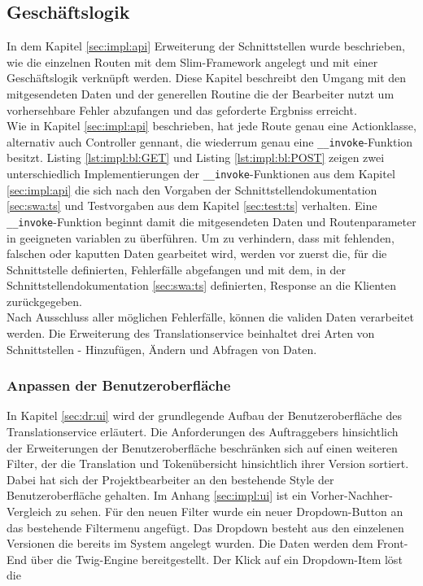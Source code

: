 \documentclass[10pt, oneside]{article}
\begin{document}
  \subsection{Geschäftslogik}\label{sec:impl:bl}
    In dem Kapitel \ref{sec:impl:api} Erweiterung der Schnittstellen wurde beschrieben, wie die einzelnen Routen mit dem Slim-Framework angelegt und 
    mit einer Geschäftslogik verknüpft werden. Diese Kapitel beschreibt den Umgang mit den mitgesendeten Daten und der generellen Routine die der Bearbeiter
    nutzt um vorhersehbare Fehler abzufangen und das geforderte Ergbniss erreicht.\\ 
    Wie in Kapitel \ref{sec:impl:api} beschrieben, hat jede Route genau eine Actionklasse, alternativ auch Controller gennant, die wiederrum genau eine \lstinline{__invoke}-Funktion besitzt. Listing \ref{lst:impl:bl:GET} und Listing \ref{lst:impl:bl:POST} 
    zeigen zwei unterschiedlich Implementierungen der \lstinline{__invoke}-Funktionen aus dem Kapitel \ref{sec:impl:api} die sich nach den Vorgaben der Schnittstellendokumentation \ref{sec:swa:ts} und Testvorgaben aus dem Kapitel \ref{sec:test:ts} verhalten.
    Eine \lstinline{__invoke}-Funktion beginnt damit die mitgesendeten Daten und Routenparameter in geeigneten variablen zu überführen. Um zu verhindern, dass mit 
    fehlenden, falschen oder kaputten Daten gearbeitet wird, werden vor zuerst die, für die Schnittstelle definierten, Fehlerfälle abgefangen und mit dem, in der Schnittstellendokumentation \ref{sec:swa:ts} definierten, Response
    an die Klienten zurückgegeben.\\
    Nach Ausschluss aller möglichen Fehlerfälle, können die validen Daten verarbeitet werden. Die Erweiterung des Translationservice beinhaltet drei Arten von Schnittstellen - Hinzufügen, Ändern und Abfragen von Daten.
    
  \subsubsection{Anpassen der Benutzeroberfläche}
    In Kapitel \ref{sec:dr:ui} wird der grundlegende Aufbau der Benutzeroberfläche des Translationservice erläutert. Die Anforderungen des Auftraggebers hinsichtlich der 
    Erweiterungen der Benutzeroberfläche beschränken sich auf einen weiteren Filter, der die Translation und Tokenübersicht hinsichtlich ihrer Version sortiert.
    Dabei hat sich der Projektbearbeiter an den bestehende Style der Benutzeroberfläche gehalten. Im Anhang \ref{sec:impl:ui} ist ein Vorher-Nachher-Vergleich zu sehen.
    Für den neuen Filter wurde ein neuer Dropdown-Button an das bestehende Filtermenu angefügt. Das Dropdown besteht aus den einzelenen Versionen die bereits im System angelegt wurden.
    Die Daten werden dem Front-End über die Twig-Engine bereitgestellt. Der Klick auf ein Dropdown-Item löst die %
\end{document}

